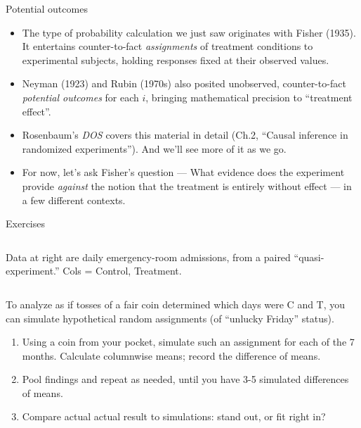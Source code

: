 \begin{frame}{Potential outcomes}
  
  \begin{itemize}[<+->]
  \item The type of probability calculation we just saw originates
    with Fisher (1935). It entertains counter-to-fact
    \textit{assignments} of treatment conditions to experimental
    subjects, holding responses fixed at their observed values.
  \item Neyman (1923) and Rubin (1970s) also posited
    unobserved, counter-to-fact \textit{potential outcomes} for each
    $i$, bringing mathematical precision to ``treatment effect''.
   \item Rosenbaum's \textit{DOS} covers this material in detail
       (Ch.2, ``Causal inference in randomized experiments''). And we'll
       see more of it as we go.
   \item For now, let's ask Fisher's question --- What evidence does
     the experiment provide \textit{against} the notion that the
     treatment is entirely without effect --- in a few different contexts.
  \end{itemize}

\end{frame}

\begin{frame}{Exercises}

  \begin{columns}
    \begin{Column}[.35\linewidth]
      Data at right are daily emergency-room admissions, from a paired
    ``quasi-experiment.'' Cols = Control, Treatment. 
    \end{Column}
    \begin{Column}[.65\linewidth]
    \end{Column}
  \end{columns}  

    To analyze as if tosses of a fair coin determined which days
    were C and T, you can simulate  hypothetical random assignments
    (of ``unlucky Friday'' status).
  
  \begin{enumerate}
   \item Using a coin from your pocket, simulate such an assignment for
    each of the 7 months.  Calculate columnwise means; record the
    difference of means.
  \item Pool findings and repeat as needed, until you have 3-5 simulated
    differences of means. 
  \item Compare actual actual result to simulations: stand out, or fit
    right in?
  \end{enumerate}
  
\end{frame}

